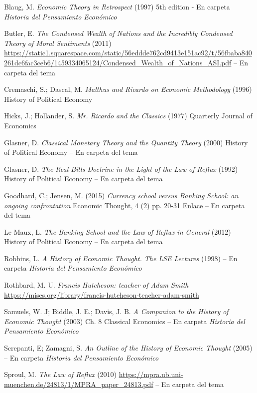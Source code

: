 \documentclass{nuevotema}
\begin{document}
Blaug, M. \textit{Economic Theory in Retrospect} (1997) 5th edition - En carpeta \textit{Historia del Pensamiento Económico}

Butler, E. \textit{The Condensed Wealth of Nations and the Incredibly Condensed Theory of Moral Sentiments} (2011) \url{https://static1.squarespace.com/static/56eddde762cd9413e151ac92/t/56fbaba840261dc6fac3ceb6/1459334065124/Condensed_Wealth_of_Nations_ASI.pdf} -- En carpeta del tema

Cremaschi, S.; Dascal, M. \textit{Malthus and Ricardo on Economic Methodology} (1996) History of Political Economy

Hicks, J.; Hollander, S. \textit{Mr. Ricardo and the Classics} (1977) Quarterly Journal of Economics

Glasner, D. \textit{Classical Monetary Theory and the Quantity Theory} (2000) History of Political Economy -- En carpeta del tema

Glasner, D. \textit{The Real-Bills Doctrine in the Light of the Law of Reflux} (1992) History of Political Economy -- En carpeta del tema

Goodhard, C.; Jensen, M. (2015) \textit{Currency school versus Banking School: an ongoing confrontation} Economic Thought, 4 (2) pp. 20-31 \href{http://eprints.lse.ac.uk/64068/1/Currency\%20School\%20versus\%20Banking\%20School.pdf}{Enlace} -- En carpeta del tema

Le Maux, L. \textit{The Banking School and the Law of Reflux in General} (2012) History of Political Economy -- En carpeta del tema

Robbins, L. \textit{A History of Economic Thought. The LSE Lectures} (1998) -- En carpeta \textit{Historia del Pensamiento Económico}

Rothbard, M. U. \textit{Francis Hutcheson: teacher of Adam Smith} \url{https://mises.org/library/francis-hutcheson-teacher-adam-smith}

Samuels, W. J; Biddle, J. E.; Davis, J. B. \textit{A Companion to the History of Economic Thought} (2003) Ch. 8 Classical Economics -- En carpeta \textit{Historia del Pensamiento Económico}

Screpanti, E; Zamagni, S. \textit{An Outline of the History of Economic Thought} (2005) -- En carpeta \textit{Historia del Pensamiento Económico}

Sproul, M. \textit{The Law of Reflux} (2010) \url{https://mpra.ub.uni-muenchen.de/24813/1/MPRA_paper_24813.pdf} -- En carpeta del tema
\end{document}

